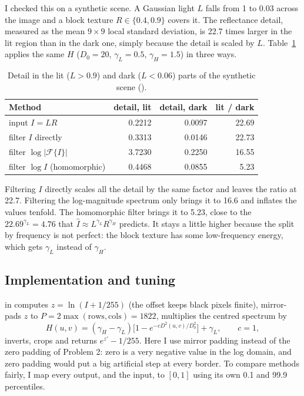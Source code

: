 I checked this on a synthetic scene. A Gaussian light $L$ falls from 1 to 0.03
across the image and a block texture $R\in\{0.4,0.9\}$ covers it. The
reflectance detail, measured as the mean $9\times9$ local standard deviation, is
22.7 times larger in the lit region than in the dark one, simply because the
detail is scaled by $L$. Table~\ref{tab:logcheck} applies the same $H$
($D_0=20$, $\gamma_L=0.5$, $\gamma_H=1.5$) in three ways.

\begin{table}[H]
\centering
\begin{tabular}{lrrr}
\toprule
Method & detail, lit & detail, dark & lit / dark\\
\midrule
input $I=LR$ & 0.2212 & 0.0097 & 22.69\\
filter $I$ directly & 0.3313 & 0.0146 & 22.73\\
filter $\log|\mathcal{F}\{I\}|$ & 3.7230 & 0.2250 & 16.55\\
filter $\log I$ (homomorphic) & 0.4468 & 0.0855 & 5.23\\
\bottomrule
\end{tabular}
\caption{Detail in the lit ($L>0.9$) and dark ($L<0.06$) parts of the synthetic
scene ().}
\label{tab:logcheck}
\end{table}

Filtering $I$ directly scales all the detail by the same factor and leaves the
ratio at 22.7. Filtering the log-magnitude spectrum only brings it to 16.6 and
inflates the values tenfold. The homomorphic filter brings it to 5.23, close to
the $22.69^{\gamma_L}=4.76$ that $\hat I\approx L^{\gamma_L}R^{\gamma_H}$
predicts. It stays a little higher because the split by frequency is not
perfect: the block texture has some low-frequency energy, which gets $\gamma_L$
instead of $\gamma_H$.

\subsection{Implementation and tuning}

 in  computes
$z=\ln(I+1/255)$ (the offset keeps black pixels finite), mirror-pads $z$ to
$P=2\max(\text{rows},\text{cols})=1822$, multiplies the centred spectrum by
\begin{equation}
H(u,v)=(\gamma_H-\gamma_L)\big[1-e^{-cD^2(u,v)/D_0^2}\big]+\gamma_L,\qquad c=1,
\end{equation}
inverts, crops and returns $e^{z'}-1/255$. Here I use mirror padding instead of
the zero padding of Problem 2: zero is a very negative value in the log domain,
and zero padding would put a big artificial step at every border. To compare
methods fairly, I map every output, and the input, to $[0,1]$ using its own 0.1
and 99.9 percentiles.

